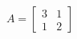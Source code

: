 \documentclass[preview]{standalone}
\begin{document}
\begin{align*}
A = \begin{bmatrix} 3 & 1 \\ 1 & 2 \end{bmatrix}
\end{align*}
\end{document}
